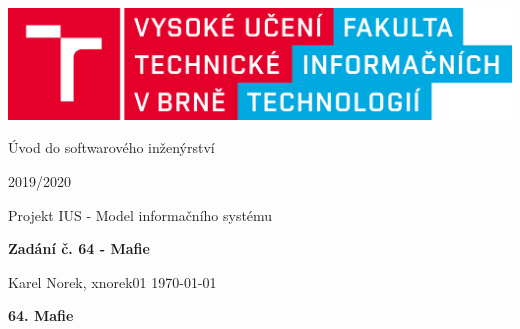 \documentclass{article}
\begin{document}
\begin{titlepage}
    \begin{center}
        \includegraphics[scale=0.1,keepaspectratio]{fig/logo_cz.png}
        
        \vspace{3cm}
        
        {\Huge Úvod do softwarového inženýrství}
        
        \vspace{0.25cm}
        
        {\LARGE 2019/2020}
        
        \vspace{2cm}
        
        {\LARGE Projekt IUS - Model informačního systému}
        
        \vspace{0.25cm}
        
        {\textbf{\LARGE Zadání č. 64 - Mafie}}
        \vfill
    \end{center}
    {\LARGE Karel Norek, xnorek01 \hfill \today}

\end{titlepage}

\textbf{\flushleft \LARGE 64. Mafie}

\vspace{0.25cm}
\end{document}
